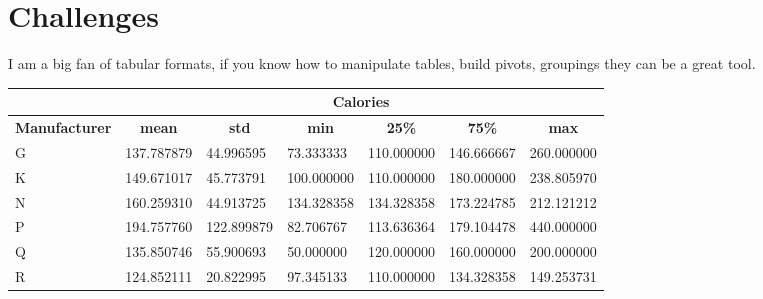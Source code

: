 \documentclass{article}
\begin{document}
\section{Challenges}

I am a big fan of tabular formats, if you know how to manipulate tables, build pivots, groupings they can be a great tool.


\begin{table}[H]
\begin{tabular}{lllllll}
\cline{2-7}
\multicolumn{1}{c}{\textbf{}}             & \multicolumn{6}{c}{\textbf{Calories}}                                                                                                                                                                              \\ \hline
\multicolumn{1}{c}{\textbf{Manufacturer}} & \multicolumn{1}{c}{\textbf{mean}} & \multicolumn{1}{c}{\textbf{std}} & \multicolumn{1}{c}{\textbf{min}} & \multicolumn{1}{c}{\textbf{25\%}} & \multicolumn{1}{c}{\textbf{75\%}} & \multicolumn{1}{c}{\textbf{max}} \\ \hline
G                                         & 137.787879                        & 44.996595                        & 73.333333                        & 110.000000                        & 146.666667                        & 260.000000                       \\
K                                         & 149.671017                        & 45.773791                        & 100.000000                       & 110.000000                        & 180.000000                        & 238.805970                       \\
N                                         & 160.259310                        & 44.913725                        & 134.328358                       & 134.328358                        & 173.224785                        & 212.121212                       \\
P                                         & 194.757760                        & 122.899879                       & 82.706767                        & 113.636364                        & 179.104478                        & 440.000000                       \\
Q                                         & 135.850746                        & 55.900693                        & 50.000000                        & 120.000000                        & 160.000000                        & 200.000000                       \\
R                                         & 124.852111                        & 20.822995                        & 97.345133                        & 110.000000                        & 134.328358                        & 149.253731                       \\ \hline
\end{tabular}
\end{table}
\end{document}
